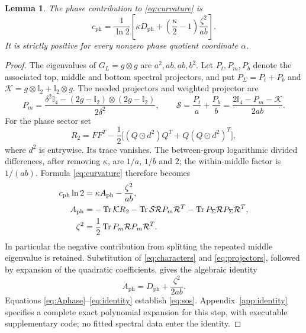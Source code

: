 \documentclass[11pt]{article}
\newcommand{\Tr}{\operatorname{Tr}}
\newcommand{\id}{\mathbb I}
\newtheorem{lemma}{Lemma}
\begin{document}
\begin{lemma}\label{lem:phase}
The phase contribution to \eqref{eq:curvature} is
\begin{equation}\label{eq:sos}
 c_{\mathrm{ph}}=
 \frac{1}{\ln2}\left[
       \kappa D_{\mathrm{ph}}+
       \left(\frac{\kappa}{2}-1\right)\frac{\zeta^2}{ab}\right].
\end{equation}
It is strictly positive for every nonzero phase quotient coordinate $\alpha$.
\end{lemma}

\begin{proof}
The eigenvalues of $G_L=g\otimes g$ are $a^2,ab,ab,b^2$. Let $P_t,P_m,P_b$ denote the associated top, middle and bottom spectral projectors, and put $P_\Sigma=P_t+P_b$ and $\mathcal K=g\otimes\id_2+\id_2\otimes g$. The needed projectors and weighted projector are
\begin{equation}\label{eq:projectors}
 P_m=\frac{\delta^2\id_4-(2g-\id_2)\otimes(2g-\id_2)}{2\delta^2},
 \qquad
 \mathcal S=\frac{P_t}{a}+\frac{P_b}{b}
            =\frac{2\id_4-P_m-\mathcal K}{2ab}.
\end{equation}
For the phase sector set
\begin{equation}\label{eq:R2}
 R_2=FF^T-\frac12\bigl[(Q\odot d^2)Q^T+Q(Q\odot d^2)^T\bigr],
\end{equation}
where $d^2$ is entrywise. Its trace vanishes. The between-group logarithmic divided differences, after removing $\kappa$, are $1/a$, $1/b$ and $2$; the within-middle factor is $1/(ab)$. Formula \eqref{eq:curvature} therefore becomes
\begin{align}\label{eq:Aphase}
 c_{\mathrm{ph}}\ln2&=\kappa A_{\mathrm{ph}}-\frac{\zeta^2}{ab},\notag\\
 A_{\mathrm{ph}}&=-\Tr\mathcal K R_2
     -\Tr\mathcal S\mathcal R P_m\mathcal R^T
     -\Tr P_\Sigma\mathcal R P_\Sigma\mathcal R^T,\notag\\
 \zeta^2&=\frac12\Tr P_m\mathcal R P_m\mathcal R^T.
\end{align}
In particular the negative contribution from splitting the repeated middle eigenvalue is retained. Substitution of \eqref{eq:characters} and \eqref{eq:projectors}, followed by expansion of the quadratic coefficients, gives the algebraic identity
\begin{equation}\label{eq:identity}
 A_{\mathrm{ph}}=D_{\mathrm{ph}}+\frac{\zeta^2}{2ab}.
\end{equation}
Equations \eqref{eq:Aphase}--\eqref{eq:identity} establish \eqref{eq:sos}. Appendix~\ref{app:identity} specifies a complete exact polynomial expansion for this step, with executable supplementary code; no fitted spectral data enter the identity.


\end{proof}
\end{document}
